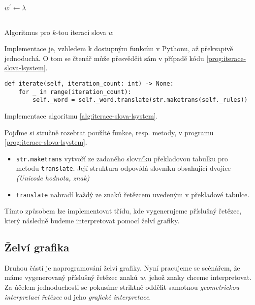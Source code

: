 \begin{algorithm}[h]
    $w^\prime\gets\lambda$\\
    \\
    \caption{Algoritmus pro $k$-tou iteraci slova $w$}
    \label{alg:iterace-slova-lsystem}
\end{algorithm}
Implementace je, vzhledem k dostupným funkcím v Pythonu, až překvapivě jednoduchá. O tom se čtenář může přesvědčit sám v případě kódu \ref{prog:iterace-slova-lsystem}.
\begin{program}[h]
\begin{lstlisting}[style=python]
def iterate(self, iteration_count: int) -> None:
    for _ in range(iteration_count):
        self._word = self._word.translate(str.maketrans(self._rules))
\end{lstlisting}
    \caption{Implementace algoritmu \ref{alg:iterace-slova-lsystem}.}
    \label{prog:iterace-slova-lsystem}
\end{program}
Pojďme si stručně rozebrat použíté funkce, resp. metody, v programu \ref{prog:iterace-slova-lsystem}.
\begin{itemize}
    \item \texttt{str.maketrans} vytvoří ze zadaného slovníku překladovou tabulku pro metodu \texttt{translate}. Její struktura odpovídá slovníku obsahující dvojice \emph{(Unicode hodnota, znak)}
    \item \texttt{translate} nahradí každý ze znaků řetězcem uvedeným v překladové tabulce.
\end{itemize}
Tímto způsobem lze implementovat třídu, kde vygenerujeme příslušný řetězec, který následně budeme interpretovat pomocí želví grafiky.

\subsection{Želví grafika}\label{subsec:implementace-zelvi-grafiky}

Druhou částí je naprogramování želví grafiky. Nyní pracujeme se scénářem, že máme vygenerovaný příslušný řetězec znaků $w$, jehož znaky chceme interpretovat. Za účelem jednoduchosti se pokusíme striktně oddělit samotnou \emph{geometrickou interpretaci řetězce} od jeho \emph{grafické interpretace}.

